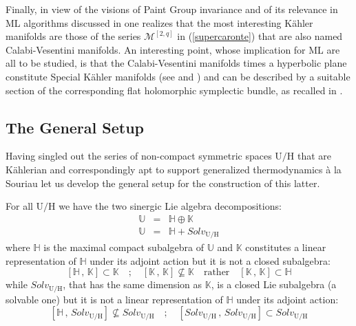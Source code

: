 \documentclass[10pt,a4paper]{article}
\begin{document}
Finally, in view of the visions of Paint Group invariance and of its relevance in ML algorithms discussed in
\cite{pgtstheory,tassellandum} one realizes that the most interesting  K\"ahler manifolds are those of the series $\mathcal{M}^{[2,q]}$ in (\ref{supercaronte}) that are also named Calabi-Vesentini manifolds. An interesting point, whose implication for ML are all to be
studied, is that the Calabi-Vesentini manifolds times a hyperbolic plane constitute Special K\"ahler manifolds (see
\cite{mylecture} and \cite{pgtstheory})  and can be described by a suitable section of the corresponding flat holomorphic symplectic bundle, as recalled in \cite{pgtstheory}.
\subsection{The General Setup}
\label{settonasale}
Having singled out the series of non-compact symmetric spaces $\mathrm{U/H}$ that are K\"ahlerian and correspondingly apt to support generalized thermodynamics {\`a} la Souriau let us develop the general setup for the construction of this latter.
\par
For all $\mathrm{U/H}$ we have the two sinergic Lie algebra decompositions:
\begin{eqnarray}
\label{sinergico}
  \mathbb{U} &=& \mathbb{H} \oplus \mathbb{K} \label{cane1}\\
  \mathbb{U} &=& \mathbb{H} + Solv_{\mathrm{U/H}} \label{cane2}
\end{eqnarray}
where $\mathbb{H}$ is the maximal compact subalgebra of $\mathbb{U}$ and $\mathbb{K}$ constitutes a linear representation of $\mathbb{\mathbb{H}}$ under its adjoint action but it is not a closed subalgebra:
\begin{equation}\label{grullo1}
  \left[\mathbb{H} \, , \, \mathbb{K} \right] \subset \mathbb{K} \quad ; \quad \left[\mathbb{K} \, , \, \mathbb{K} \right]\nsubseteq \mathbb{K} \quad \text{rather} \quad \left[\mathbb{K} \, , \, \mathbb{K} \right] \subset \mathbb{H}
\end{equation}
while $Solv_{\mathrm{U/H}}$, that has the same dimension as $\mathbb{K}$, is a closed Lie subalgebra (a solvable one) but it is not a linear representation of $\mathbb{H}$ under its adjoint action:
\begin{equation}\label{grullo2}
  \left[\mathbb{H} \, , \, Solv_{\mathrm{U/H}} \right] \nsubseteq Solv_{\mathrm{U/H}} \quad ; \quad \left[Solv_{\mathrm{U/H}} \, , \, Solv_{\mathrm{U/H}} \right] \subset Solv_{\mathrm{U/H}}
\end{equation}
\end{document}
